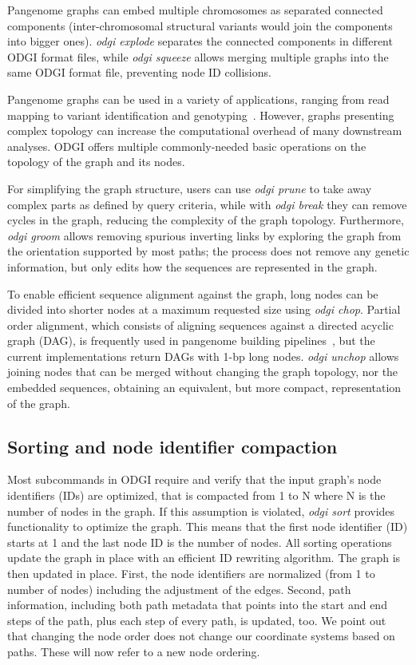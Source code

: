 \documentclass{bioinfo}
\begin{document}
Pangenome graphs can embed multiple chromosomes as separated connected components (inter-chromosomal structural variants would join the components into bigger ones).
\textit{odgi explode} separates the connected components in different ODGI format files, while \textit{odgi squeeze} allows merging multiple graphs into the same ODGI format file, preventing node ID collisions.

Pangenome graphs can be used in a variety of applications, ranging from read mapping to variant identification and genotyping~\citep{Eizenga_2020}.
However, graphs presenting complex topology can increase the computational overhead of many downstream analyses.
ODGI offers multiple commonly-needed basic operations on the topology of the graph and its nodes.

For simplifying the graph structure, users can use \textit{odgi prune} to take away complex parts as defined by query criteria,
while with \textit{odgi break} they can remove cycles in the graph, reducing the complexity of the graph topology.
Furthermore, \textit{odgi groom} allows removing spurious inverting links by exploring the graph from the orientation supported by most paths;
the process does not remove any genetic information, but only edits how the sequences are represented in the graph.

To enable efficient sequence alignment against the graph, long nodes can be divided into shorter nodes at a maximum requested size using \textit{odgi chop}.
Partial order alignment, which consists of aligning sequences against a directed acyclic graph (DAG), is frequently used in pangenome building pipelines~\citep{pggb}, but the current implementations return DAGs with 1-bp long nodes.
\textit{odgi unchop} allows joining nodes that can be merged without changing the graph topology, nor the embedded sequences, obtaining an equivalent, but more compact, representation of the graph.

\subsection{Sorting and node identifier compaction}
\label{sec:supp_sorting}
Most subcommands in ODGI require and verify that the input graph’s node identifiers (IDs) are optimized, that is compacted from 1 to N where N is the number of nodes in the graph. 
If this assumption is violated, \textit{odgi sort} provides functionality to optimize the graph. 
This means that the first node identifier (ID) starts at 1 and the last node ID is the number of nodes. 
All sorting operations update the graph in place with an efficient ID rewriting algorithm.
The graph is then updated in place. 
First, the node identifiers are normalized (from 1 to number of nodes) including the adjustment of the edges. 
Second, path information, including both path metadata that points into the start and end steps of the path, plus each step of every path, is updated, too. 
We point out that changing the node order does not change our coordinate systems based on paths. 
These will now refer to a new node ordering.
\end{document}
